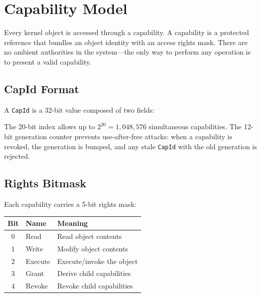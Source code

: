 \documentclass[11pt,a4paper,twoside]{report}
\theoremstyle{definition}
\begin{document}
\section{Capability Model}

Every kernel object is accessed through a capability. A capability is a
protected reference that bundles an object identity with an access rights
mask. There are no ambient authorities in the system---the only way to
perform any operation is to present a valid capability.

\subsection{CapId Format}

A \texttt{CapId} is a 32-bit value composed of two fields:

\begin{center}
\end{center}

The 20-bit index allows up to $2^{20} = 1{,}048{,}576$ simultaneous
capabilities. The 12-bit generation counter prevents use-after-free
attacks: when a capability is revoked, the generation is bumped, and any
stale \texttt{CapId} with the old generation is rejected.

\subsection{Rights Bitmask}

Each capability carries a 5-bit rights mask:

\begin{table}[H]
\centering
\begin{tabular}{c l l}
\toprule
\textbf{Bit} & \textbf{Name} & \textbf{Meaning} \\
\midrule
0 & Read    & Read object contents \\
1 & Write   & Modify object contents \\
2 & Execute & Execute/invoke the object \\
3 & Grant   & Derive child capabilities \\
4 & Revoke  & Revoke child capabilities \\
\bottomrule
\end{tabular}
\end{table}
\end{document}
